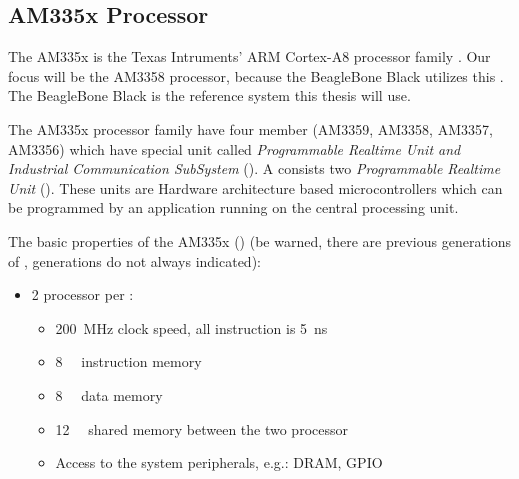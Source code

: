 \subsection{AM335x Processor}

The AM335x is the Texas Intruments' ARM Cortex-A8 processor family \citep{AM335x}. Our focus will be the AM3358 processor, because the BeagleBone Black \citep{BBB} utilizes this \cpu. The BeagleBone Black is the reference system this thesis will use.

The AM335x processor family have four member (AM3359, AM3358, AM3357, AM3356) which have special unit called \emph{Programmable Realtime Unit and Industrial Communication SubSystem} (\pruss). A \pruss consists two \emph{Programmable Realtime Unit} (\pru). These units are Hardware architecture based microcontrollers which can be programmed by an application running on the central processing unit.

The basic properties of the AM335x (\pruss) (be warned, there are previous generations of \pruss, generations do not always indicated):
\begin{itemize}
	\item 2 \pru processor per \pruss:
		\begin{itemize}
			\item \SI{200}{\mega\hertz} clock speed, all instruction is \SI{5}{\nano\second}
			\item \SI{8}{\kilo\byte} instruction memory
			\item \SI{8}{\kilo\byte} data memory
			\item \SI{12}{\kilo\byte} shared memory between the two processor
			\item Access to the system peripherals, e.g.: DRAM, GPIO
		\end{itemize}
\end{itemize}

